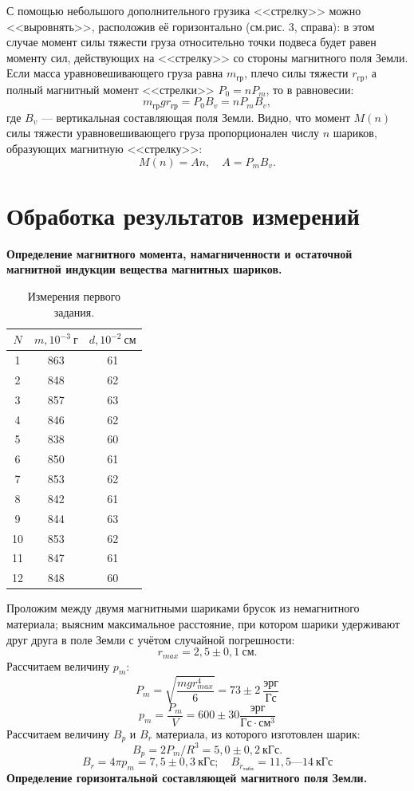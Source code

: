 \documentclass[a4paper, fontsize=14pt]{article}
\begin{document}
 С помощью  небольшого  дополнительного грузика  <<стрелку>>  можно <<выровнять>>, расположив её горизонтально (см.рис. 3, справа): в этом случае момент силы тяжести груза относительно точки  подвеса будет  равен моменту сил,  действующих на <<стрелку>> со стороны магнитного поля  Земли. Если масса уравновешивающего груза равна $m_\text{гр}$, плечо силы тяжести $r_\text{гр}$, а полный магнитный момент <<стрелки>> $P_0 = n P_m$, то в равновесии: 
\[
	m_\text{гр} g r_\text{гр} = P_0 B_v = n P_m B_v,
\]
где $B_v$ --- вертикальная составляющая поля Земли.
Видно, что момент $M(n)$ силы тяжести уравновешивающего груза пропорционален числу $n$ шариков, образующих магнитную <<стрелку>>:
\[
	M(n) = An, \quad A = P_m B_v.
\]
\section*{Обработка результатов измерений}
\textbf{Определение магнитного момента, намагниченности и остаточной магнитной индукции вещества магнитных шариков.}

\begin{table}[H]

	\centering
	\begin{tabular}{|c|c|c|} \hline
		$N$ &  $m, 10^{-3}\ \text{г}$ & $d, 10^{-2}\ \text{см}$ \\\hline
		1 &  863 &  61 \\\hline
		2 &  848 &  62 \\\hline
		3 &  857 &  63 \\\hline
		4 &  846 &  62 \\\hline
		5 &  838 &  60 \\\hline
		6 &  850 &  61 \\\hline
		7 &  853 &  62 \\\hline
		8 &  842 &  61 \\\hline
		9 &  844 &  63 \\\hline
		10 &  853 &  62 \\\hline
		11 &  847 &  61 \\\hline
		12 &  848 &  60 \\\hline
	\end{tabular}	
	\caption{Измерения первого задания.}
\end{table}
Проложим между двумя магнитными шариками брусок из немагнитного материала; выясним максимальное расстояние, при котором шарики удерживают друг друга в поле Земли с учётом случайной погрешности:
\[
	r_{max} = 2,5 \pm 0,1\ \text{см}.
\]
Рассчитаем величину $p_m$:
\[
	P_m = \sqrt{\frac{mgr_{max}^4}{6}} = 73 \pm 2\ \frac{\text{эрг}}{\text{Гс}}
\]
\[
	p_m = \frac{P_m}{V} = 600 \pm 30 \frac{\text{эрг}}{\text{Гс}\cdot \text{см}^3}
\]
Рассчитаем величину $B_p$  и $B_r$ материала, из которого изготовлен шарик:
\[
	B_p = 2 P_m / R^3 = 5,0 \pm 0,2 \ \text{кГс}.
\]
\[
	B_r = 4 \pi p_m = 7,5 \pm 0,3 \ \text{кГс}; \quad B_{r_\text{табл}} = 11,5 \text{---} 14\ \text{кГс}
\]
\textbf{Определение горизонтальной составляющей магнитного поля Земли.}
\end{document}
